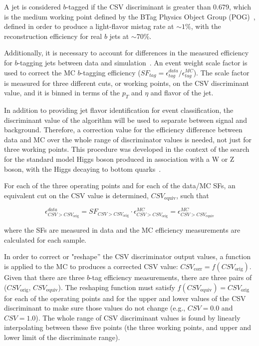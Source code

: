 \par A jet is considered $b$-tagged if the CSV discriminant is greater
than 0.679, which is the medium working point defined by the BTag
Physics Object Group (POG)~\cite{btagOP}, defined in order to produce
a light-flavor mistag rate at $\sim1\%$, with the reconstruction
efficiency for real $b$ jets at $\sim70\%$.  

\par Additionally, it is necessary to account for differences in the
measured efficiency for $b$-tagging jets between data and
simulation~\cite{CMS-PAS-BTV-11-004}.
An event weight scale factor is used to correct the MC $b$-tagging efficiency ($SF_{tag} =
\epsilon_{tag}^{data}/\epsilon_{tag}^{MC}$).  The scale factor is
measured for three different cuts, or working points, on the CSV
discriminant value, and it is binned in terms of the $p_{T}$ and
$\eta$ and flavor of the jet.  

\par In addition to providing jet flavor identification for event
classification, the discriminant value of the algorithm will be used
to separate between \ttH signal and \ttjets background.  Therefore, a
correction value for the efficiency difference between data and MC over the whole range
of discriminator values is needed, not just for three working points.
This procedure was developed in the context of the search for the
standard model Higgs boson produced in association with a W or Z
boson, with the Higgs decaying to bottom
quarks~\cite{CMS-AN-2012-181}.  

\par For each of the three operating points and for each of the
data/MC SFs, an equivalent cut on the CSV value is determined,
\(CSV_{\mathrm{equiv}}\), such that 

\begin{equation}\label{eq:csv_reweight}
\epsilon^{data}_{CSV>CSV_{\mathrm{orig}}} = SF_{CSV>CSV_{\mathrm{orig}}}\cdot\epsilon^{MC}_{CSV>CSV_{\mathrm{orig}}} = \epsilon^{MC}_{CSV>CSV_{\mathrm{equiv}}}
\end{equation}

\noindent where the SFs are measured in data and the MC efficiency
measurements are calculated for each sample.

\par In order to correct or "reshape'' the CSV discriminator output
values, a function is applied to the MC to produces a corrected CSV value:
$CSV_{\mathrm{corr}}=f(CSV_{\mathrm{orig}})$.  Given that there are
three $b$-tag efficiency measurements, there are three pairs of
($CSV_{\mathrm{orig}}$, $CSV_{\mathrm{equiv}}$). The reshaping
function must satisfy $f(CSV_{\mathrm{equiv}}) =
CSV_{\mathrm{orig}}$ for each of the operating points and for the upper
and lower values of the CSV discriminant to make sure those values do
not change (e.g., $CSV = 0.0$ and $CSV = 1.0$).  The whole range of
CSV discriminant values is found by linearly interpolating between
these five points (the three working points, and upper and lower limit
of the discriminate range).


